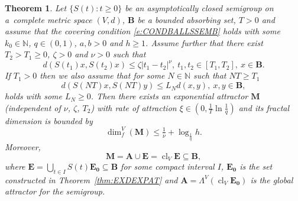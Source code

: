\documentclass[a4paper,12pt,reqno]{amsart}
\theoremstyle{plain}
\newtheorem{thm}[lem]{Theorem}
\theoremstyle{definition}
\numberwithin{equation}{section}
\newcommand{\N}{\mathbb{N}}
\newcommand{\abs}[1]{\left\vert#1\right\vert}
\newcommand{\dimf}{\operatorname{dim}_{f}}
\newcommand{\cl}{\operatorname{cl}}
\renewcommand{\geq}{\geqslant}
\renewcommand{\leq}{\leqslant}
\begin{document}
\begin{thm}\label{thm:SEM3}
Let $\{S(t)\colon t\geq 0\}$ be an asymptotically closed semigroup on a~complete metric space $(V,d)$, $\mathbf{B}$ be a bounded absorbing set, $T>0$ and assume
that the covering condition \eqref{e:CONDBALLSSEMB}
holds with some $k_0\in\N$, $q\in(0,1)$, $a,b>0$ and $h\geq 1$.
Assume further that there exist $T_2>T_1\geq 0$,
$\zeta>0$ and $\nu>0$ such that
\begin{equation}\label{e:TIMEHOLDER}
d(S(t_1)x,S(t_2)x)\leq\zeta\abs{t_1-t_2}^{\nu},\ t_1,t_2\in[T_1,T_2],\ x\in\mathbf{B}.
\end{equation}
If $T_1>0$ then we also assume that for some $N\in\N$ such that $NT\geq T_1$
\begin{equation}\label{e:LIPTSEMN}
d(S(NT)x,S(NT)y)\leq L_{N}d(x,y),\ x,y\in \mathbf{B},
\end{equation}
holds with some $L_{N}\geq 0$. Then there exists an exponential attractor
$\mathbf{M}$ (independent of $\nu$, $\zeta$, $T_2$) with rate of attraction $\xi\in(0,\frac{1}{T}\ln\frac{1}{q})$
and its fractal dimension is bounded by
\begin{equation*}
\dimf^{V}(\mathbf{M})\leq\tfrac{1}{\nu}+\log_{\frac{1}{q}}h.
\end{equation*}
Moreover,
\begin{equation*}
\mathbf{M}=\mathbf{A}\cup\mathbf{E}=\cl_{V}\mathbf{E}\subseteq\mathbf{B},
\end{equation*}
where $\mathbf{E}=\bigcup_{t\in I}S(t)\mathbf{E_0} \subseteq\mathbf{B}$ for some compact interval $I$, $\mathbf{E_0}$ is the set constructed in Theorem~\ref{thm:EXDEXPAT} and $\mathbf{A}=\Lambda^{V}(\cl_{V}\mathbf{E_0})$ is the global attractor for the semigroup.
\end{thm}
\end{document}
